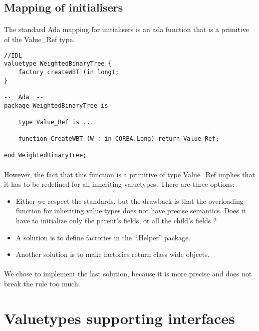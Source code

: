 \subsection{Mapping of initialisers}
\paragraph{}The standard Ada mapping for initialisers is an ada function that is a
primitive of the Value\_Ref type.

\begin{verbatim}
//IDL
valuetype WeightedBinaryTree {
	factory createWBT (in long);
}

--  Ada  --
package WeightedBinaryTree is

	type Value_Ref is ...

	function CreateWBT (W : in CORBA.Long) return Value_Ref;

end WeightedBinaryTree;
\end{verbatim}

\paragraph{}However, the fact that this function is a primitive of type
Value\_Ref implies that it has to be redefined for all inheriting
valuetypes. There are three options:

\begin{itemize}
\item Either we respect the standards, but the drawback is that the
overloading function for inheriting value types does not have precise
semantics. Does it have to initialize only the parent's fields, or all
the child's fields ?
\item A solution is to define factories in the ``.Helper'' package.
\item Another solution is to make factories return class wide objects.
\end{itemize}

\paragraph{}We chose to implement the last solution, because it is
more precise and does not break the rule too much.



\section{Valuetypes supporting interfaces}

